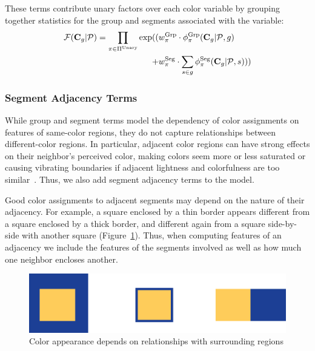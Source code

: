 These terms contribute unary factors over each color variable by grouping together statistics for the group and segments associated with the variable:
\begin{align*}
 \mathcal{F}(\mathbf{C}_g | \mathcal{P}) = \prod_{\pi \in \Pi^{\textrm{Unary}}}
 		\exp( (&w^{\textrm{Grp}}_\pi \cdot \phi^{\textrm{Grp}}_\pi(\mathbf{C}_g | \mathcal{P}, g)  \\
 		     + &w^{\textrm{Seg}}_\pi \cdot \sum_{s \in g} \phi^{\textrm{Seg}}_\pi(\mathbf{C}_g | \mathcal{P}, s))) 
\end{align*}


\subsubsection{Segment Adjacency Terms}
\label{sec:adjTerms}

While group and segment terms model the dependency of color assignments on features of same-color regions, they do not capture relationships between different-color regions. In particular, adjacent color regions can have strong effects on their neighbor's perceived color, making colors seem more or less saturated or causing vibrating boundaries if adjacent lightness and colorfulness are too similar~\cite{AlbersInteractionOfColor}. Thus, we also add segment adjacency terms to the model.

Good color assignments to adjacent segments may depend on the nature of their adjacency. For example, a square enclosed by a thin border appears different from a square enclosed by a thick border, and different again from a square side-by-side with another square (Figure~\ref{fig:surround}). Thus, when computing features of an adjacency we include the features of the segments involved as well as how much one neighbor encloses another.
\begin{figure}[ht]
\centering
\includegraphics[width=.7\columnwidth]{figs/surround}
\caption{Color appearance depends on relationships with surrounding regions}
\label{fig:surround}
\end{figure}




